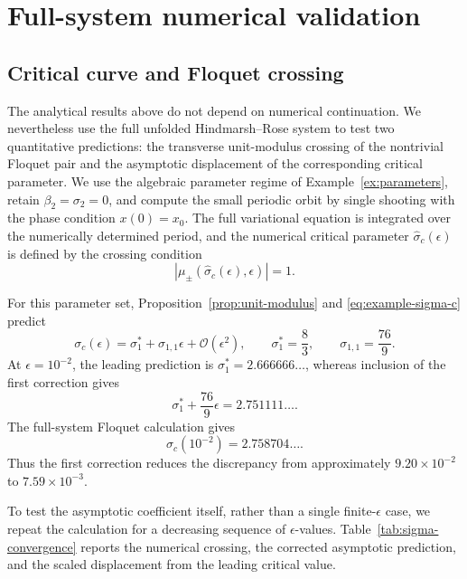 \documentclass[11pt]{amsart}
\theoremstyle{remark}
\newcommand{\cO}{\mathcal{O}}
\begin{document}
\section{Full-system numerical validation}

\subsection{Critical curve and Floquet crossing}

The analytical results above do not depend on numerical continuation.
We nevertheless use the full unfolded Hindmarsh--Rose system to test two
quantitative predictions: the transverse unit-modulus crossing of the
nontrivial Floquet pair and the asymptotic displacement of the corresponding
critical parameter.  We use the algebraic parameter regime of
Example~\ref{ex:parameters}, retain \(\beta_2=\sigma_2=0\), and compute the
small periodic orbit by single shooting with the phase condition
\(x(0)=x_0\).  The full variational equation is integrated over the
numerically determined period, and the numerical critical parameter
\(\widehat{\sigma}_c(\epsilon)\) is defined by the crossing condition
\[
 |\mu_\pm(\widehat{\sigma}_c(\epsilon),\epsilon)|=1 .
\]

For this parameter set, Proposition~\ref{prop:unit-modulus} and
\eqref{eq:example-sigma-c} predict
\[
 \sigma_c(\epsilon)
 =\sigma_1^*+\sigma_{1,1}\epsilon+\cO(\epsilon^2),
 \qquad
 \sigma_1^*=\frac83,\qquad
 \sigma_{1,1}=\frac{76}{9}.
\]
At \(\epsilon=10^{-2}\), the leading prediction is
\(\sigma_1^*=2.666666\ldots\), whereas inclusion of the first correction gives
\[
 \sigma_1^*+\frac{76}{9}\epsilon
 =2.751111\ldots .
\]
The full-system Floquet calculation gives
\[
 \widehat{\sigma}_c(10^{-2})=2.758704\ldots .
\]
Thus the first correction reduces the discrepancy from approximately
\(9.20\times10^{-2}\) to \(7.59\times10^{-3}\).

To test the asymptotic coefficient itself, rather than a single
finite-\(\epsilon\) case, we repeat the calculation for a decreasing
sequence of \(\epsilon\)-values.  Table~\ref{tab:sigma-convergence} reports the numerical
crossing, the corrected asymptotic prediction, and the scaled displacement
from the leading critical value.
\end{document}
